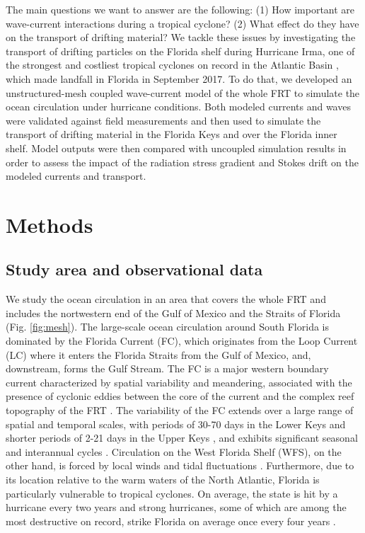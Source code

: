 The main questions we want to answer are the following: (1) How important are wave-current interactions during a tropical cyclone? (2) What effect do they have on the transport of drifting material? We tackle these issues by investigating the transport of drifting particles on the Florida shelf during Hurricane Irma, one of the strongest and costliest tropical cyclones on record in the Atlantic Basin \citep{xian2018brief}, which made landfall in Florida in September 2017. To do that, we developed an unstructured-mesh coupled wave-current model of the whole FRT to simulate the ocean circulation under hurricane conditions. Both modeled currents and waves were validated against field measurements and then used to simulate the transport of drifting material in the Florida Keys and over the Florida inner shelf. Model outputs were then compared with uncoupled simulation results in order to assess the impact of the radiation stress gradient and Stokes drift on the modeled currents and transport.  

\section{Methods}
\subsection{Study area and observational data}
We study the ocean circulation in an area that covers the whole FRT and includes the nortwestern end of the Gulf of Mexico and the Straits of Florida (Fig. \ref{fig:mesh}). The large-scale ocean circulation around South Florida is dominated by the Florida Current (FC), which originates from the Loop Current (LC) where it enters the Florida Straits from the Gulf of Mexico, and, downstream, forms the Gulf Stream. The FC is a major western boundary current characterized by spatial variability and meandering, associated with the presence of cyclonic eddies between the core of the current and the complex reef topography of the FRT \citep{lee1995florida,kourafalou2012florida}. The variability of the FC extends over a large range of spatial and temporal scales, with periods of 30-70 days in the Lower Keys \citep{lee1995florida} and shorter periods of 2-21 days in the Upper Keys \citep{lee1977low}, and exhibits significant seasonal and interannual cycles \citep{johns1987meandering, lee1988wind,schott1988variability}. Circulation on the West Florida Shelf (WFS), on the other hand, is forced by local winds and tidal fluctuations \citep{lee2002volume,liu2012seasonal}. Furthermore, due to its location relative to the warm waters of the North Atlantic, Florida is particularly vulnerable to tropical cyclones. On average, the state is hit by a hurricane every two years and strong hurricanes, some of which are among the most destructive on record, strike Florida on average once every four years \citep{malmstadt2009florida}.

